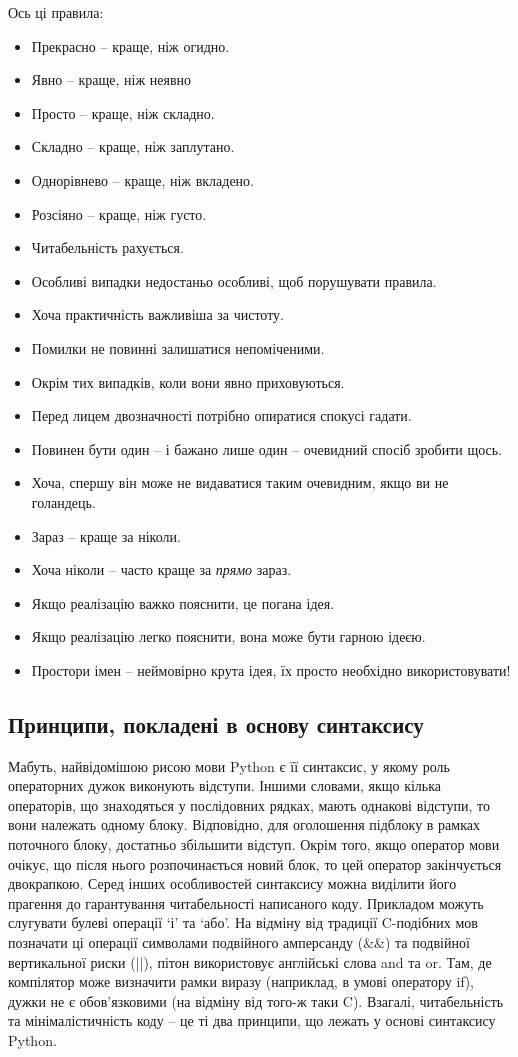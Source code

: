 \documentclass[a4paper, 12pt]{article}
\begin{document}
Ось ці правила:
\begin{itemize}
    \item Прекрасно -- краще, ніж огидно.
    \item Явно -- краще, ніж неявно
    \item Просто -- краще, ніж складно.
    \item Складно -- краще, ніж заплутано.
    \item Однорівнево -- краще, ніж вкладено.
    \item Розсіяно -- краще, ніж густо.
    \item Читабельність рахується.
    \item Особливі випадки недостаньо особливі, щоб порушувати правила.
    \item Хоча практичність важливіша за чистоту.
    \item Помилки не повинні залишатися непоміченими.
    \item Окрім тих випадків, коли вони явно приховуються.
    \item Перед лицем двозначності потрібно опиратися спокусі гадати.
    \item Повинен бути один -- і бажано лише один -- очевидний спосіб зробити щось.
    \item Хоча, спершу він може не видаватися таким очевидним, якщо ви не голандець.
    \item Зараз -- краще за ніколи.
    \item Хоча ніколи -- часто краще за \emph{прямо} зараз.
    \item Якщо реалізацію важко пояснити, це погана ідея.
    \item Якщо реалізацію легко пояснити, вона може бути гарною ідеєю.
    \item Простори імен -- неймовірно крута ідея, їх просто необхідно використовувати!
\end{itemize}

\subsection{Принципи, покладені в основу синтаксису}
Мабуть, найвідомішою рисою мови Python є її синтаксис, у якому роль операторних дужок
виконують відступи. Іншими словами, якщо кілька операторів, що знаходяться у послідовних 
рядках, мають однакові відступи, то вони належать одному блоку. Відповідно, для оголошення
підблоку в рамках поточного блоку, достатньо збільшити відступ. Окрім того, якщо оператор
мови очікує, що після нього розпочинається новий блок, то цей оператор закінчується 
двокрапкою. Серед інших особливостей синтаксису можна виділити його прагення до
гарантування читабельності написаного коду. Прикладом можуть слугувати булеві операції `і'
та `або'. На відміну від традиції C-подібних мов позначати ці операції символами подвійного
амперсанду (\&\&) та подвійної вертикальної риски (||), пітон використовує англійські слова
and та or. Там, де компілятор може визначити рамки виразу (наприклад, в умові оператору if),
дужки не є обов'язковими (на відміну від того-ж таки C). Взагалі, читабельність та
мінімалістичність коду -- це ті два принципи, що лежать у основі синтаксису Python.
\end{document}
